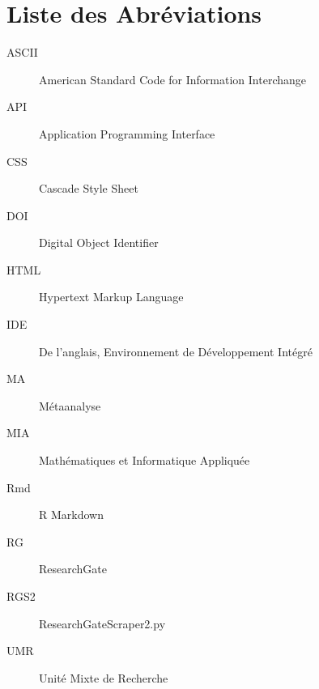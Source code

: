 \documentclass{book}
\begin{document}
\newpage
\mbox{} %


\newpage
\listoffigures %
\thispagestyle{fancy}


\newpage
\mbox{} %


\newpage
{}
\chapter*{Liste des Abréviations}

\begin{description}
    \item[ASCII] American Standard Code for Information Interchange
    \item[API] Application Programming Interface
    \item[CSS] Cascade Style Sheet
    \item[DOI] Digital Object Identifier
    \item[HTML] Hypertext Markup Language
    \item[IDE] De l'anglais, Environnement de Développement Intégré
    \item[MA] Métaanalyse
    \item[MIA] Mathématiques et Informatique Appliquée
    \item[Rmd] R Markdown
    \item[RG] ResearchGate
    \item[RGS2] ResearchGateScraper2.py
    \item[UMR] Unité Mixte de Recherche

\end{description}
\thispagestyle{fancy}
\end{document}
